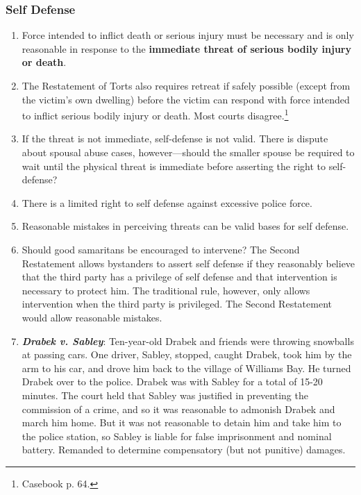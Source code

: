 \subsubsection{Self Defense}




\begin{enumerate}
    \item Force intended to inflict death or serious injury must be necessary 
    and is only reasonable in response to the \textbf{immediate threat of 
    serious bodily injury or death}.
    \item The Restatement of Torts also requires retreat if safely possible 
    (except from the victim's own dwelling) before the victim can respond with 
    force intended to inflict serious bodily injury or death. Most courts 
    disagree.\footnote{Casebook p. 64.}
    \item If the threat is not immediate, self-defense is not valid. There is 
    dispute about spousal abuse cases, however---should the smaller spouse be 
    required to wait until the physical threat is immediate before asserting 
    the right to self-defense?
    \item There is a limited right to self defense against excessive police 
    force.
    \item Reasonable mistakes in perceiving threats can be valid bases for 
    self defense.
    \item Should good samaritans be encouraged to intervene? The Second 
    Restatement allows bystanders to assert self defense if they reasonably 
    believe that the third party has a privilege of self defense and that 
    intervention is necessary to protect him. The traditional rule, however, 
    only allows intervention when the third party is privileged. The Second 
    Restatement would allow reasonable mistakes.
    \item \textbf{\emph{Drabek v. Sabley}}: Ten-year-old Drabek and friends 
    were throwing snowballs at passing cars. One driver, Sabley, stopped, 
    caught Drabek, took him by the arm to his car, and drove him back to the 
    village of Williams Bay. He turned Drabek over to the police. Drabek was 
    with Sabley for a total of 15-20 minutes. The court held that Sabley was 
    justified in preventing the commission of a crime, and so it was 
    reasonable to admonish Drabek and march him home. But it was not 
    reasonable to detain him and take him to the police station, so Sabley is 
    liable for false imprisonment and nominal battery. Remanded to determine 
    compensatory (but not punitive) damages.
\end{enumerate}

